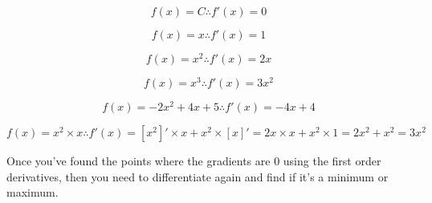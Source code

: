 
\[
  f(x) = C \therefore f'(x) = 0
\]

\[
  f(x) = x \therefore f'(x) = 1
\]

\[
  f(x) = x^2 \therefore f'(x) = 2x
\]

\[
  f(x) = x^3 \therefore f'(x) = 3x^2
\]

\[
  f(x) = -2x^2 + 4x + 5 \therefore f'(x) = -4x + 4
\]

\[
  f(x) = x^2 \times x \therefore
    f'(x) = [x^2]' \times x + x^2 \times [x]' = 2x \times x + x^2 \times 1
          = 2x^2 + x^2 = 3x^2
\]

Once you've found the points where the gradients are 0 using the first order
derivatives, then you need to differentiate again and find if it's a minimum or
maximum.


